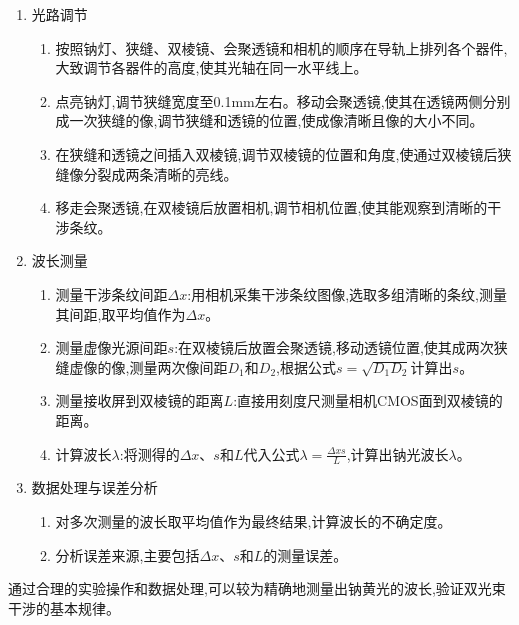 \documentclass[UTF8]{ctexart}
\begin{document}
\begin{enumerate}
    \item 光路调节
    \begin{enumerate}
        \item 按照钠灯、狭缝、双棱镜、会聚透镜和相机的顺序在导轨上排列各个器件,大致调节各器件的高度,使其光轴在同一水平线上。
        \item 点亮钠灯,调节狭缝宽度至0.1mm左右。移动会聚透镜,使其在透镜两侧分别成一次狭缝的像,调节狭缝和透镜的位置,使成像清晰且像的大小不同。
        \item 在狭缝和透镜之间插入双棱镜,调节双棱镜的位置和角度,使通过双棱镜后狭缝像分裂成两条清晰的亮线。
        \item 移走会聚透镜,在双棱镜后放置相机,调节相机位置,使其能观察到清晰的干涉条纹。
    \end{enumerate}
    
    \item 波长测量
    \begin{enumerate}
        \item 测量干涉条纹间距$\Delta x$:用相机采集干涉条纹图像,选取多组清晰的条纹,测量其间距,取平均值作为$\Delta x$。
        \item 测量虚像光源间距$s$:在双棱镜后放置会聚透镜,移动透镜位置,使其成两次狭缝虚像的像,测量两次像间距$D_1$和$D_2$,根据公式$s=\sqrt{D_1D_2}$计算出$s$。
        \item 测量接收屏到双棱镜的距离$L$:直接用刻度尺测量相机CMOS面到双棱镜的距离。
        \item 计算波长$\lambda$:将测得的$\Delta x$、$s$和$L$代入公式$\lambda=\frac{\Delta xs}{L}$,计算出钠光波长$\lambda$。
    \end{enumerate}
    
    \item 数据处理与误差分析
    \begin{enumerate}
        \item 对多次测量的波长取平均值作为最终结果,计算波长的不确定度。
        \item 分析误差来源,主要包括$\Delta x$、$s$和$L$的测量误差。
    \end{enumerate}
\end{enumerate}

通过合理的实验操作和数据处理,可以较为精确地测量出钠黄光的波长,验证双光束干涉的基本规律。
\end{document}
